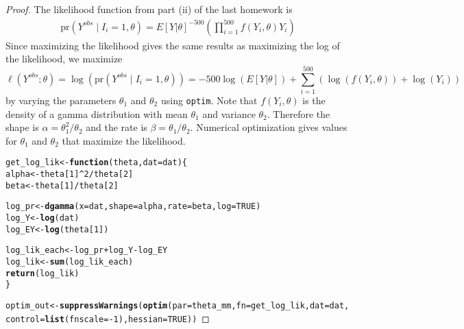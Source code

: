 \documentclass[letterpaper, 12pt]{article}\usepackage[]{graphicx}\usepackage[]{color}
\makeatletter
\newcommand{\hlnum}[1]{\textcolor[rgb]{0.686,0.059,0.569}{#1}}%
\newcommand{\hlopt}[1]{\textcolor[rgb]{0,0,0}{#1}}%
\newcommand{\hlstd}[1]{\textcolor[rgb]{0.345,0.345,0.345}{#1}}%
\newcommand{\hlkwa}[1]{\textcolor[rgb]{0.161,0.373,0.58}{\textbf{#1}}}%
\newcommand{\hlkwb}[1]{\textcolor[rgb]{0.69,0.353,0.396}{#1}}%
\newcommand{\hlkwc}[1]{\textcolor[rgb]{0.333,0.667,0.333}{#1}}%
\newcommand{\hlkwd}[1]{\textcolor[rgb]{0.737,0.353,0.396}{\textbf{#1}}}%
\newenvironment{kframe}{%
 \def\at@end@of@kframe{}%
 \ifinner\ifhmode%
  \def\at@end@of@kframe{\end{minipage}}%
  \begin{minipage}{\columnwidth}%
 \fi\fi%
 \def\FrameCommand##1{\hskip\@totalleftmargin \hskip-\fboxsep
 \colorbox{shadecolor}{##1}\hskip-\fboxsep
     \hskip-\linewidth \hskip-\@totalleftmargin \hskip\columnwidth}%
 \MakeFramed {\advance\hsize-\width
   \@totalleftmargin\z@ \linewidth\hsize
   \@setminipage}}%
 {\par\unskip\endMakeFramed%
 \at@end@of@kframe}
\newenvironment{knitrout}{}{} %
\newcommand{\pr}{\text{pr}}
\newcommand{\sbs}{\;|\;} %
\makeatother
\begin{document}
\begin{proof}
The likelihood function from part (ii) of the last homework is 
\begin{align*}
\pr(Y^{obs} \sbs I_i = 1, \theta) = 
E[Y|\theta]^{-500}
\left(
\prod_{i=1}^{500}
f(Y_i,\theta) Y_i
\right)
\end{align*}
Since maximizing the likelihood gives the same results as maximizing the log of the likelihood, we maximize
\begin{equation*}
\ell(Y^{obs} ; \theta)
=
\log(\pr(Y^{obs} \sbs I_i = 1, \theta)) =
-500 \log(E[Y|\theta]) +
 \sum_{i=1}^{500}
 ( \log(f(Y_i, \theta)) + \log( Y_i) )
\end{equation*}
by varying the parameters $\theta_1$ and $\theta_2$ using \texttt{optim}. Note that $f(Y_i, \theta)$ is the density of a gamma distribution with mean $\theta_1$ and variance $\theta_2$. Therefore the shape is $\alpha = \theta_1^2 / \theta_2$ and the rate is $\beta=\theta_1/\theta_2$.
Numerical optimization gives values for $\theta_1$ and $\theta_2$ that maximize the likelihood.

\begin{knitrout}
\color{fgcolor}\begin{kframe}
\begin{alltt}
\hlstd{get_log_lik} \hlkwb{<-} \hlkwa{function}\hlstd{(}\hlkwc{theta}\hlstd{,} \hlkwc{dat} \hlstd{= dat) \{}
    \hlstd{alpha} \hlkwb{<-} \hlstd{theta[}\hlnum{1}\hlstd{]}\hlopt{^}\hlnum{2}\hlopt{/}\hlstd{theta[}\hlnum{2}\hlstd{]}
    \hlstd{beta} \hlkwb{<-} \hlstd{theta[}\hlnum{1}\hlstd{]}\hlopt{/}\hlstd{theta[}\hlnum{2}\hlstd{]}

    \hlstd{log_pr} \hlkwb{<-} \hlkwd{dgamma}\hlstd{(}\hlkwc{x} \hlstd{= dat,} \hlkwc{shape} \hlstd{= alpha,} \hlkwc{rate} \hlstd{= beta,} \hlkwc{log} \hlstd{=} \hlnum{TRUE}\hlstd{)}
    \hlstd{log_Y} \hlkwb{<-} \hlkwd{log}\hlstd{(dat)}
    \hlstd{log_EY} \hlkwb{<-} \hlkwd{log}\hlstd{(theta[}\hlnum{1}\hlstd{])}

    \hlstd{log_lik_each} \hlkwb{<-} \hlstd{log_pr} \hlopt{+} \hlstd{log_Y} \hlopt{-} \hlstd{log_EY}
    \hlstd{log_lik} \hlkwb{<-} \hlkwd{sum}\hlstd{(log_lik_each)}
    \hlkwd{return}\hlstd{(log_lik)}
\hlstd{\}}

\hlstd{optim_out} \hlkwb{<-} \hlkwd{suppressWarnings}\hlstd{(}\hlkwd{optim}\hlstd{(}\hlkwc{par} \hlstd{= theta_mm,} \hlkwc{fn} \hlstd{= get_log_lik,} \hlkwc{dat} \hlstd{= dat,}
    \hlkwc{control} \hlstd{=} \hlkwd{list}\hlstd{(}\hlkwc{fnscale} \hlstd{=} \hlopt{-}\hlnum{1}\hlstd{),} \hlkwc{hessian} \hlstd{=} \hlnum{TRUE}\hlstd{))}


\end{alltt}
\end{kframe}
\end{knitrout}
\end{proof}
\end{document}
